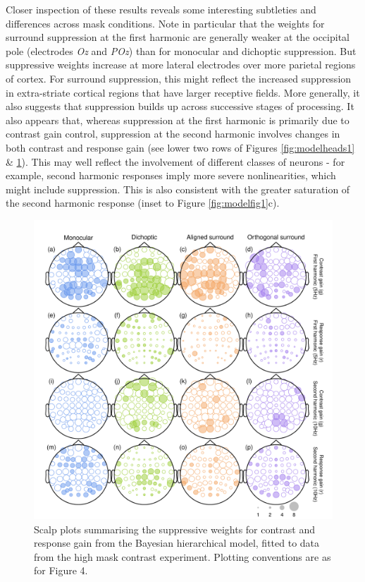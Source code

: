 \documentclass[]{article}
\begin{document}
Closer inspection of these results reveals some interesting subtleties and differences across mask conditions. Note in particular that the weights for surround suppression at the first harmonic are generally weaker at the occipital pole (electrodes \emph{Oz} and \emph{POz}) than for monocular and dichoptic suppression. But suppressive weights increase at more lateral electrodes over more parietal regions of cortex. For surround suppression, this might reflect the increased suppression in extra-striate cortical regions that have larger receptive fields. More generally, it also suggests that suppression builds up across successive stages of processing. It also appears that, whereas suppression at the first harmonic is primarily due to contrast gain control, suppression at the second harmonic involves changes in both contrast and response gain (see lower two rows of Figures \ref{fig:modelheads1} \& \ref{fig:modelheads2}). This may well reflect the involvement of different classes of neurons - for example, second harmonic responses imply more severe nonlinearities, which might include suppression. This is also consistent with the greater saturation of the second harmonic response (inset to Figure \ref{fig:modelfig1}c).

\begin{figure}

{\centering \includegraphics{figures/modelheads2} 

}

\caption{Scalp plots summarising the suppressive weights for contrast and response gain from the Bayesian hierarchical model, fitted to data from the high mask contrast experiment. Plotting conventions are as for Figure 4.}\label{fig:modelheads2}
\end{figure}
\end{document}
